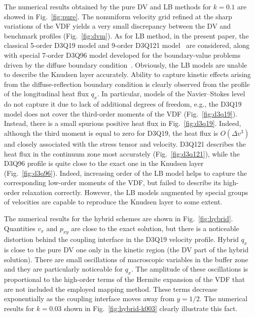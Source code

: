 \documentclass[]{elsarticle} %
\newcommand{\OO}[1]{O(#1)}
\begin{document}
The numerical results obtained by the pure DV and LB methods for \(k=0.1\) are showed in Fig.~\ref{fig:pure}.
The nonuniform velocity grid refined at the sharp variations of the VDF yields a very small discrepancy
between the DV and benchmark profiles (Fig.~\ref{fig:dvm}).
As for LB method, in the present paper, the classical 5-order D3Q19 model and 9-order D3Q121 model~\cite{Shan2010} are considered,
along with special 7-order D3Q96 model developed for the boundary-value problems driven by the diffuse boundary condition~\cite{Feuchter2016}.
Obviously, the LB models are unable to describe the Knudsen layer accurately.
Ability to capture kinetic effects arising from the diffuse-reflection boundary condition
is clearly observed from the profile of the longitudinal heat flux \(q_x\).
In particular, models of the Navier--Stokes level do not capture it due to lack of additional degrees of freedom,
e.g., the D3Q19 model does not cover the third-order moments of the VDF (Fig.~\ref{fig:d3q19}).
Instead, there is a small spurious positive heat flux in Fig.~\ref{fig:d3q19}.
Indeed, although the third moment is equal to zero for D3Q19,
the heat flux is \(\OO{\Delta v^3}\) and closely associated with the stress tensor and velocity.
D3Q121 describes the heat flux in the continuum zone most accurately (Fig.~\ref{fig:d3q121}),
while the D3Q96 profile is quite close to the exact one in the Knudsen layer (Fig.~\ref{fig:d3q96}).
Indeed, increasing order of the LB model helps to capture the corresponding low-order moments of the VDF,
but failed to describe its high-order relaxation correctly.
However, the LB models augmented by special groups of velocities are capable to reproduce the Knudsen layer to some extent.

The numerical results for the hybrid schemes are shown in Fig.~\ref{fig:hybrid}.
Quantities \(v_x\) and \(p_{xy}\) are close to the exact solution,
but there is a noticeable distortion behind the coupling interface in the D3Q19 velocity profile.
Hybrid \(q_x\) is close to the pure DV one only in the kinetic region (the DV part of the hybrid solution).
There are small oscillations of macroscopic variables in the buffer zone and they are particularly noticeable for \(q_x\).
The amplitude of these oscillations is proportional to the high-order terms of the Hermite expansion of the VDF
that are not included the employed mapping method.
These terms decrease exponentially as the coupling interface moves away from \(y=1/2\).
The numerical results for \(k=0.03\) shown in Fig.~\ref{fig:hybrid-k003} clearly illustrate this fact.
\end{document}
